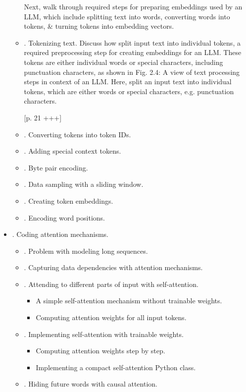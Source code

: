 \documentclass{article}
\begin{document}
\begin{itemize}
\begin{itemize}
		Next, walk through required steps for preparing embeddings used by an LLM, which include splitting text into words, converting words into tokens, \& turning tokens into embedding vectors.
		\item {. Tokenizing text.} Discuss how split input text into individual tokens, a required preprocessing step for creating embeddings for an LLM. These tokens are either individual words or special characters, including punctuation characters, as shown in {\sf Fig. 2.4: A view of text processing steps in context of an LLM. Here, split an input text into individual tokens, which are either words or special characters, e.g. punctuation characters.}
		
		[p. 21 +++]
		\item {. Converting tokens into token IDs.}
		\item {. Adding special context tokens.}
		\item {. Byte pair encoding.}
		\item {. Data sampling with a sliding window.}
		\item {. Creating token embeddings.}
		\item {. Encoding word positions.}
	\end{itemize}
	\item {. Coding attention mechanisms.}
	\begin{itemize}
		\item {. Problem with modeling long sequences.}
		\item {. Capturing data dependencies with attention mechanisms.}
		\item {. Attending to different parts of input with self-attention.}
		\begin{itemize}
			\item {\sf A simple self-attention mechanism without trainable weights.}
			\item {\sf Computing attention weights for all input tokens.}
		\end{itemize}
		\item {. Implementing self-attention with trainable weights.}
		\begin{itemize}
			\item {\sf Computing attention weights step by step.}
			\item {\sf Implementing a compact self-attention Python class.}
		\end{itemize}
		\item {. Hiding future words with causal attention.}

\end{itemize}
\end{itemize}
\end{document}
